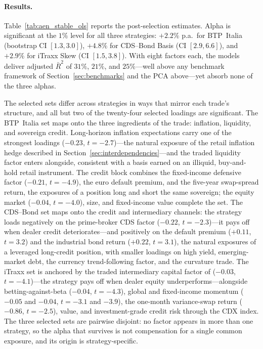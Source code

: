 \paragraph{Results.}

Table~\ref{tab:aen_stable_ols} reports the post-selection estimates.
Alpha is significant at the $1\%$ level for all three strategies:
$+2.2\%$ p.a.\ for BTP~Italia (bootstrap CI $[1.3, 3.0]$), $+4.8\%$
for CDS--Bond Basis (CI $[2.9, 6.6]$), and $+2.9\%$ for iTraxx
Skew (CI $[1.5, 3.8]$). With eight factors each, the models
deliver adjusted $\bar{R}^2$ of $31\%$, $21\%$, and $25\%$---well
above any benchmark framework of Section~\ref{sec:benchmarks} and the
PCA above---yet absorb none of the three alphas.

The selected sets differ across strategies in ways that mirror each
trade's structure, and all but two of the twenty-four selected
loadings are significant. The BTP~Italia set maps onto the three ingredients of the trade:
inflation, liquidity, and sovereign credit. Long-horizon inflation
expectations carry one of the strongest loadings ($-0.23$,
$t = -2.7$)---the natural exposure of the retail inflation hedge
described in Section~\ref{sec:interdependencies}---and the
\citet{pastor2003liquidity} traded liquidity factor enters alongside,
consistent with a basis earned on an illiquid, buy-and-hold retail
instrument. The credit block combines the fixed-income defensive
factor ($-0.21$, $t = -4.9$), the euro default premium, and the
five-year swap-spread return, the exposures of a position long and
short the same sovereign; the equity market ($-0.04$, $t = -4.0$),
size, and fixed-income value complete the set. The CDS--Bond set
maps onto the credit and intermediary channels: the strategy loads
negatively on the prime-broker CDS factor ($-0.22$, $t = -2.3$)---it
pays off when dealer credit deteriorates---and positively on the
default premium ($+0.11$, $t = 3.2$) and the industrial bond return
($+0.22$, $t = 3.1$), the natural exposures of a leveraged
long-credit position, with smaller loadings on high yield,
emerging-market debt, the currency trend-following factor, and the
curvature trade. The iTraxx set is
anchored by the traded intermediary capital factor of
\citet{he2017intermediary} ($-0.03$, $t = -4.1$)---the strategy pays
off when dealer equity underperforms---alongside
betting-against-beta ($-0.04$, $t = -4.3$), global and fixed-income
momentum ($-0.05$ and $-0.04$, $t = -3.1$ and $-3.9$), the one-month
variance-swap return ($-0.86$, $t = -2.5$), value, and
investment-grade credit risk through the CDX index. The three selected
sets are pairwise
disjoint: no factor appears in more than one strategy, so the alpha
that survives is not compensation for a single common exposure, and
its origin is strategy-specific.

